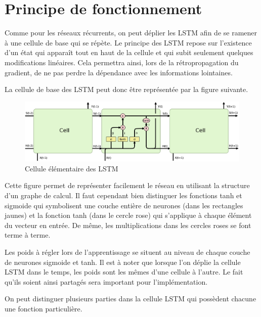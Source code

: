 \newpage

\section{Principe de fonctionnement}
Comme pour les réseaux récurrents, on peut déplier les LSTM afin de se ramener à une cellule de base qui se répète. Le principe des LSTM repose sur l'existence d'un état qui apparaît tout en haut de la cellule et qui subit seulement quelques modifications linéaires. Cela permettra ainsi, lors de la rétropropagation du gradient, de ne pas perdre la dépendance avec les informations lointaines.

La cellule de base des LSTM peut donc être représentée par la figure suivante.

\begin{figure}[h!]
\begin{center}
\includegraphics[scale=0.12]{images/chapter6/LSTM_article_plusieurscell.png}
\caption{Cellule élémentaire des LSTM}
\label{cellule LSTM}
\end{center}
\end{figure}

Cette figure permet de représenter facilement le réseau en utilisant la structure d'un graphe de calcul. Il faut cependant bien distinguer les fonctions tanh et sigmoide qui symbolisent une couche entière de neurones (dans les rectangles jaunes) et la fonction tanh (dans le cercle rose) qui s'applique à chaque élément du vecteur en entrée. De même, les multiplications dans les cercles roses se font terme à terme.

Les poids à régler lors de l'apprentissage se situent au niveau de chaque couche de neurones sigmoide et tanh. Il est à noter que lorsque l'on déplie la cellule LSTM dans le temps, les poids sont les mêmes d'une cellule à l'autre. Le fait qu'ils soient ainsi partagés sera important pour l'implémentation.

On peut distinguer plusieurs parties dans la cellule LSTM qui possèdent chacune une fonction particulière.

